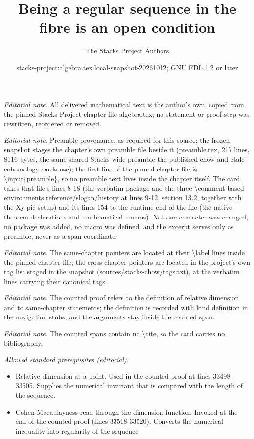 \documentclass[10pt,a4paper]{amsart}
\title{Being a regular sequence in the fibre is an open condition}
\author{The Stacks Project Authors}
\date{stacks-project:algebra.tex:local-snapshot-20261012; GNU FDL 1.2 or later}
\theoremstyle{plain}
\theoremstyle{definition}
\theoremstyle{remark}
\numberwithin{equation}{subsection}
\begin{document}
\maketitle
\noindent\textit{Editorial note.} All delivered mathematical text is the author's own, copied from the pinned Stacks Project chapter file algebra.tex; no statement or proof step was rewritten, reordered or removed.\par\medskip
\noindent\textit{Editorial note.} Preamble provenance, as required for this source: the frozen snapshot stages the chapter's own preamble file beside it (preamble.tex, 217 lines, 8116 bytes, the same shared Stacks-wide preamble the published chow and etale-cohomology cards use); the first line of the pinned chapter file is \textbackslash{}input\{preamble\}, so no preamble text lives inside the chapter itself. The card takes that file's lines 8-18 (the verbatim package and the three \textbackslash{}comment-based environments reference/slogan/history at lines 9-12, section 13.2, together with the Xy-pic setup) and its lines 154 to the runtime end of the file (the native theorem declarations and mathematical macros). Not one character was changed, no package was added, no macro was defined, and the excerpt serves only as preamble, never as a span coordinate.\par\medskip
\noindent\textit{Editorial note.} The same-chapter pointers are located at their \textbackslash{}label lines inside the pinned chapter file; the cross-chapter pointers are located in the project's own tag list staged in the snapshot (sources/stacks-chow/tags.txt), at the verbatim lines carrying their canonical tags.\par\medskip
\noindent\textit{Editorial note.} The counted proof refers to the definition of relative dimension and to same-chapter statements; the definition is recorded with kind definition in the navigation stubs, and the arguments stay inside the counted span.\par\medskip
\noindent\textit{Editorial note.} The counted spans contain no \textbackslash{}cite, so the card carries no bibliography.\par\medskip
\noindent\textit{Allowed standard prerequisites (editorial).}\begin{itemize}
\item Relative dimension at a point. Used in the counted proof at lines 33498-33505. Supplies the numerical invariant that is compared with the length of the sequence.
\item Cohen-Macaulayness read through the dimension function. Invoked at the end of the counted proof (lines 33518-33520). Converts the numerical inequality into regularity of the sequence.
\end{itemize}\medskip
\end{document}
